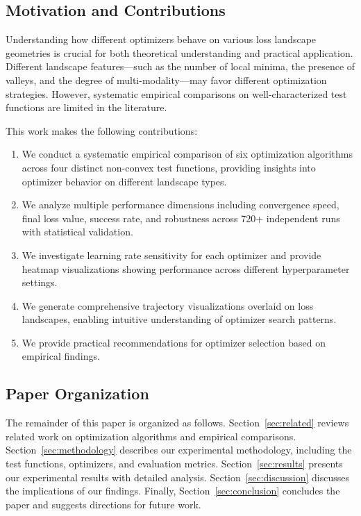 \documentclass[12pt,a4paper]{article}
\begin{document}
\subsection{Motivation and Contributions}

Understanding how different optimizers behave on various loss landscape geometries is crucial for both theoretical understanding and practical application. Different landscape features—such as the number of local minima, the presence of valleys, and the degree of multi-modality—may favor different optimization strategies. However, systematic empirical comparisons on well-characterized test functions are limited in the literature.

This work makes the following contributions:

\begin{enumerate}
    \item We conduct a systematic empirical comparison of six optimization algorithms across four distinct non-convex test functions, providing insights into optimizer behavior on different landscape types.
    \item We analyze multiple performance dimensions including convergence speed, final loss value, success rate, and robustness across 720+ independent runs with statistical validation.
    \item We investigate learning rate sensitivity for each optimizer and provide heatmap visualizations showing performance across different hyperparameter settings.
    \item We generate comprehensive trajectory visualizations overlaid on loss landscapes, enabling intuitive understanding of optimizer search patterns.
    \item We provide practical recommendations for optimizer selection based on empirical findings.
\end{enumerate}

\subsection{Paper Organization}

The remainder of this paper is organized as follows. Section~\ref{sec:related} reviews related work on optimization algorithms and empirical comparisons. Section~\ref{sec:methodology} describes our experimental methodology, including the test functions, optimizers, and evaluation metrics. Section~\ref{sec:results} presents our experimental results with detailed analysis. Section~\ref{sec:discussion} discusses the implications of our findings. Finally, Section~\ref{sec:conclusion} concludes the paper and suggests directions for future work.
\end{document}
